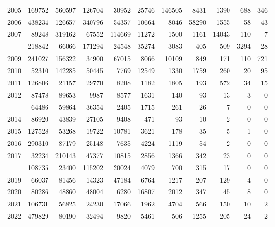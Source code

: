 \documentclass[
]{article}
\begin{document}
\begin{longtable}[t]{lrrrrrrrrrr}
2005 & 169752 & 560597 & 126704 & 30952 & 25746 & 146505 & 8431 & 1390 & 688 & 346\\
2006 & 438234 & 126657 & 340796 & 54357 & 10664 & 8046 & 58290 & 1555 & 58 & 43\\
2007 & 89248 & 319162 & 67552 & 114669 & 11272 & 1500 & 1161 & 14043 & 110 & 7\\
\addlinespace
2008 & 218842 & 66066 & 171294 & 24548 & 35274 & 3083 & 405 & 509 & 3294 & 28\\
2009 & 241027 & 156322 & 34900 & 67015 & 8066 & 10109 & 849 & 171 & 110 & 721\\
2010 & 52310 & 142285 & 50445 & 7769 & 12549 & 1330 & 1759 & 260 & 20 & 95\\
2011 & 126806 & 21157 & 29770 & 8208 & 1182 & 1805 & 193 & 572 & 34 & 15\\
2012 & 87478 & 89653 & 9987 & 8577 & 1631 & 140 & 93 & 13 & 3 & 0\\
\addlinespace
2013 & 64486 & 59864 & 36354 & 2405 & 1715 & 261 & 26 & 7 & 0 & 0\\
2014 & 86920 & 43839 & 27105 & 9408 & 471 & 93 & 10 & 2 & 0 & 0\\
2015 & 127528 & 53268 & 19722 & 10781 & 3621 & 178 & 35 & 5 & 1 & 0\\
2016 & 290310 & 87179 & 25148 & 7635 & 4224 & 1119 & 54 & 2 & 0 & 0\\
2017 & 32234 & 210143 & 47377 & 10815 & 2856 & 1366 & 342 & 23 & 0 & 0\\
\addlinespace
2018 & 108735 & 23400 & 115202 & 20024 & 4079 & 700 & 315 & 17 & 0 & 0\\
2019 & 66037 & 81456 & 14323 & 47184 & 6764 & 1217 & 207 & 129 & 4 & 0\\
2020 & 80286 & 48860 & 48004 & 6280 & 16807 & 2012 & 347 & 45 & 8 & 0\\
2021 & 106731 & 56825 & 24230 & 17066 & 1962 & 4704 & 566 & 150 & 10 & 2\\
2022 & 479829 & 80190 & 32494 & 9820 & 5461 & 506 & 1255 & 205 & 24 & 2\\*
\end{longtable}
\end{document}
